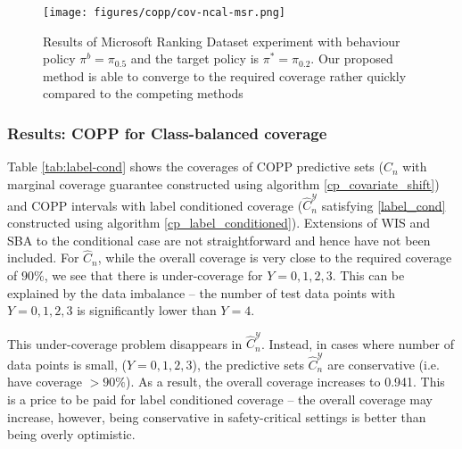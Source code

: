 \begin{figure*}[htp!]
    \centering
    \texttt{[image: figures/copp/cov-ncal-msr.png]} %
    \label{fig:ncal-msr}
    \caption{Results of Microsoft Ranking Dataset experiment with behaviour policy $\pi^b = \pi_{0.5}$ and the target policy is $\pi^* = \pi_{0.2}$. Our proposed method is able to converge to the required coverage rather quickly compared to the competing methods}
    \label{fig:msr}
\end{figure*}
\newpage
\subsubsection{Results: COPP for Class-balanced coverage}\label{sec:results_class_bal_coverage}

%
Table \ref{tab:label-cond} shows the coverages of COPP predictive sets ($\hat{C}_n$ with marginal coverage guarantee constructed using algorithm \ref{cp_covariate_shift}) and COPP intervals with label conditioned coverage ($\hat{C}^{\mathcal{Y}}_n$ satisfying \eqref{label_cond} constructed using algorithm \ref{cp_label_conditioned}). Extensions of WIS and SBA to the conditional case are not straightforward and hence have not been included. For $\hat{C}_n$, while the overall coverage is very close to the required coverage of $90\%$, we see that there is under-coverage for $Y = 0,1,2,3$. This can be explained by the data imbalance -- the number of test data points with $Y = 0,1,2,3$ is significantly lower than $Y=4$. 

This under-coverage problem disappears in $\hat{C}^{\mathcal{Y}}_n$. Instead, in cases where number of data points is small, ($Y = 0,1,2,3$), the predictive sets $\hat{C}^{\mathcal{Y}}_n$ are conservative (i.e. have coverage $> 90\%$). As a result, the overall coverage increases to 0.941. This is a price to be paid for label conditioned coverage -- the overall coverage may increase, however, being conservative in safety-critical settings is better than being overly optimistic.

